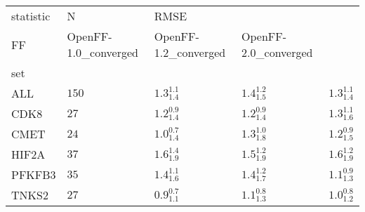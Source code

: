 \begin{tabular}{lllll}
\toprule
statistic &      N & \multicolumn{3}{l}{RMSE} \\
FF & OpenFF-1.0_converged & OpenFF-1.2_converged & OpenFF-2.0_converged \\
set    &        &                      &                      &                      \\
\midrule
ALL    &  $150$ &    $1.3^{1.1}_{1.4}$ &    $1.4^{1.2}_{1.5}$ &    $1.3^{1.1}_{1.4}$ \\
CDK8   &   $27$ &    $1.2^{0.9}_{1.4}$ &    $1.2^{0.9}_{1.4}$ &    $1.3^{1.1}_{1.6}$ \\
CMET   &   $24$ &    $1.0^{0.7}_{1.4}$ &    $1.3^{1.0}_{1.8}$ &    $1.2^{0.9}_{1.5}$ \\
HIF2A  &   $37$ &    $1.6^{1.4}_{1.9}$ &    $1.5^{1.2}_{1.9}$ &    $1.6^{1.2}_{1.9}$ \\
PFKFB3 &   $35$ &    $1.4^{1.1}_{1.6}$ &    $1.4^{1.2}_{1.7}$ &    $1.1^{0.9}_{1.3}$ \\
TNKS2  &   $27$ &    $0.9^{0.7}_{1.1}$ &    $1.1^{0.8}_{1.3}$ &    $1.0^{0.8}_{1.2}$ \\
\bottomrule
\end{tabular}
